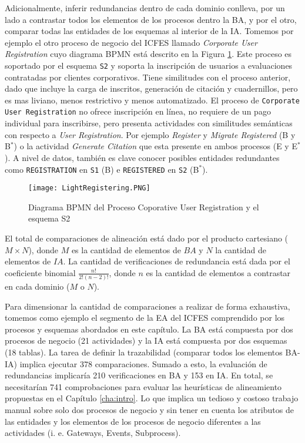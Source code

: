 Adicionalmente, inferir redundancias dentro de cada dominio conlleva, por un lado a contrastar todos los elementos de los procesos dentro la BA, y por el otro, comparar todas las entidades de los esquemas al interior de la IA. Tomemos por ejemplo el otro proceso de negocio del ICFES llamado \textit{Corporate User Registration} cuyo diagrama BPMN est\'a descrito en la Figura \ref{fig:LightRegistering}. Este proceso es soportado por el esquema \texttt{S2} y soporta la inscripci\'on de usuarios a evaluaciones contratadas por clientes corporativos. Tiene similitudes con el proceso anterior, dado que incluye la carga de inscritos, generaci\'on de citaci\'on y cuadernillos, pero es mas liviano, menos restrictivo y menos automatizado. El proceso de \texttt{Corporate User Registration} no ofrece inscripci\'on en l\'inea, no requiere de un pago individual para inscribirse, pero presenta actividades con similitudes sem\'anticas con respecto a \textit{User Registration}. Por ejemplo  \textit{Register} y \textit{Migrate Registered} (B y B$^{\ast}$) o la actividad \textit{Generate Citation} que esta presente en ambos procesos (E y E$^{\ast}$). A nivel de datos, tambi\'en es clave conocer posibles entidades redundantes como \texttt{REGISTRATION} en \texttt{S1} (B) e \texttt{REGISTERED} en \texttt{S2} (B$^{\ast}$).

\begin{figure}[!t]
\begin{center}
	\texttt{[image: LightRegistering.PNG]}
	\caption{Diagrama BPMN del Proceso Coporative User Registration y el esquema S2}
	\label{fig:LightRegistering}
\end{center}
\end{figure} 

El total de comparaciones de alineaci\'on est\'a dado por el producto cartesiano ($M \times N$), donde $M$ es la cantidad de elementos de $BA$ y $N$ la cantidad de elementos de $IA$. La cantidad de verificaciones de redundancia est\'a dada por el coeficiente binomial $\frac{{n!}}{2!(n-2)!}$, donde $n$ es la cantidad de elementos a contrastar en cada dominio ($M$ o $N$).

Para dimensionar la cantidad de comparaciones a realizar de forma exhaustiva, tomemos como ejemplo el segmento de la EA del ICFES comprendido por los procesos y esquemas abordados en este cap\'itulo. La BA est\'a compuesta por dos procesos de negocio (21 actividades) y la IA est\'a compuesta por dos esquemas (18 tablas). La tarea de definir la trazabilidad (comparar todos los elementos BA-IA) implica ejecutar 378 comparaciones. Sumado a esto, la evaluaci\'on de redundancias implicar\'ia 210 verificaciones en BA y 153 en IA. En total, se necesitar\'ian 741 comprobaciones para evaluar las heur\'isticas de alineamiento propuestas en el Cap\'itulo \ref{cha:intro}. Lo que implica un tedioso y costoso trabajo manual sobre solo dos procesos de negocio y sin tener en cuenta los atributos de las entidades y los elementos de los procesos de negocio diferentes a las actividades (i. e. Gateways, Events, Subprocess). 

